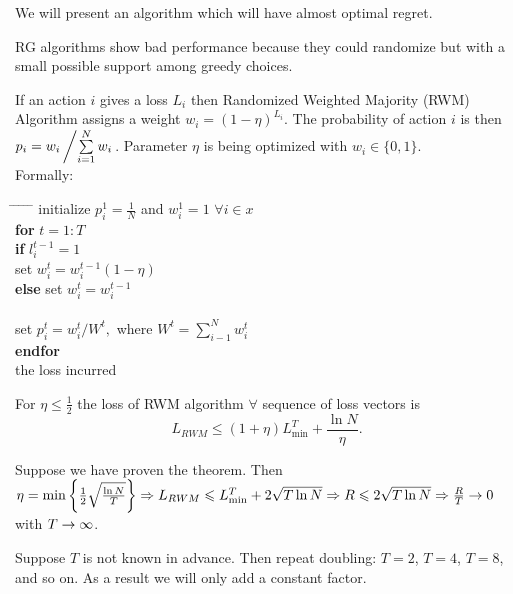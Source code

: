 
We will present an algorithm which will have almost optimal regret.

RG algorithms show bad performance because they could randomize but with a small possible support among greedy choices.
\begin{definition}
If an action $i$ gives a loss $L_i$ then Randomized Weighted Majority (RWM) Algorithm assigns a weight $w_i=(1-\eta)^{L_i}$. The probability of action $i$ is then $p_i=w_i\left/\sum\limits_{i=1}^Nw_i\right.$. Parameter $\eta$ is being optimized with $w_i\in\{0,1\}$.\\  
Formally:
\begin{tabbing}
\hspace*{.25in} \= \hspace*{.25in} \= \hspace*{.25in} \= \hspace*{.25in} \= \hspace*{.25in} \=\kill
\> initialize $p^1_i=\frac{1}{N}$ and $w^1_i=1$ $\forall i\in x$\\
\> {\bf for} $t=1:T$\\
\>\> {\bf if} $l^{t-1}_i=1$\\
\>\>\> set $w^t_i=w^{t-1}_i(1-\eta)$\\
\>\> {\bf else} set $w^t_i=w^{t-1}_i$\\
\> \\
\>\> set $p^t_i=w^t_i/W^t,$ where $W^t=\sum\limits_{i-1}^Nw^t_i$\\
\> {\bf endfor}\\
 the loss incurred
\end{tabbing}
\end{definition}
\begin{theorem}
For $\eta\leqslant\frac{1}{2}$ the loss of RWM algorithm $\forall$ sequence of loss vectors is
$$
L_{RWM}\leqslant(1+\eta)L^T_{\min}+\frac{\ln N}{\eta}.
$$
\end{theorem}
\begin{remark}
Suppose we have proven the theorem. Then $\eta=\min\left\{\frac{1}{2}\sqrt{\frac{\ln N}{T}}\right\}\Rightarrow L_{RWM}\leqslant L^T_{\min}+2\sqrt{T\ln N}\Rightarrow R\leqslant 2\sqrt{T\ln N}\Rightarrow\frac{R}{T}\rightarrow 0$ with ${T\rightarrow\infty}$.
\end{remark} 
\begin{remark}
Suppose $T$ is not known in advance. Then repeat doubling: $T=2$, $T=4$, $T=8$, and so on. As a result we will only add a constant factor.
\end{remark}
